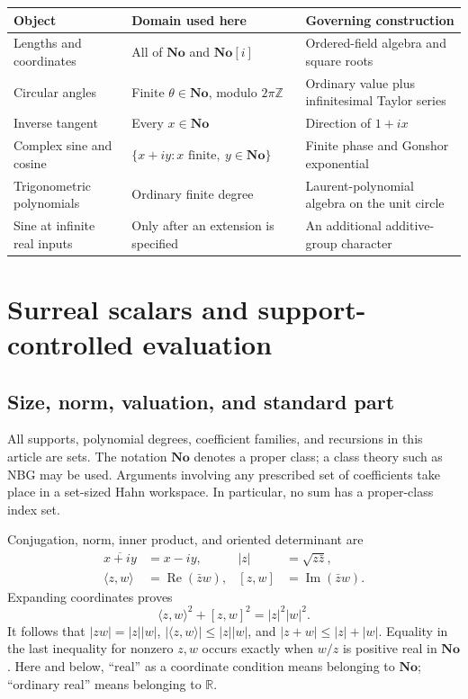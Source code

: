 \documentclass[11pt]{article}
\numberwithin{equation}{section}
\theoremstyle{definition}
\newcommand{\No}{\mathbf{No}}
\newcommand{\SC}{\mathbf{No}[i]}
\newcommand{\R}{\mathbb R}
\newcommand{\Z}{\mathbb Z}
\newcommand{\re}{\operatorname{Re}}
\newcommand{\im}{\operatorname{Im}}
\begin{document}
\begin{center}
\small
\begin{tabular}{L{0.23\textwidth}L{0.32\textwidth}L{0.35\textwidth}}
\toprule
Object & Domain used here & Governing construction\\
\midrule
Lengths and coordinates & All of $\No$ and $\SC$ & Ordered-field algebra and square roots\\
Circular angles & Finite $\theta\in\No$, modulo $2\pi\Z$ & Ordinary value plus infinitesimal Taylor series\\
Inverse tangent & Every $x\in\No$ & Direction of $1+ix$\\
Complex sine and cosine & $\{x+iy:x\text{ finite},\ y\in\No\}$ & Finite phase and Gonshor exponential\\
Trigonometric polynomials & Ordinary finite degree & Laurent-polynomial algebra on the unit circle\\
Sine at infinite real inputs & Only after an extension is specified & An additional additive-group character\\
\bottomrule
\end{tabular}
\end{center}

\section{Surreal scalars and support-controlled evaluation}\label{sec:foundations}
\subsection{Size, norm, valuation, and standard part}
All supports, polynomial degrees, coefficient families, and recursions in this article are sets. The notation $\No$ denotes a proper class; a class theory such as NBG may be used. Arguments involving any prescribed set of coefficients take place in a set-sized Hahn workspace. In particular, no sum has a proper-class index set.

Conjugation, norm, inner product, and oriented determinant are
\begin{align}
 \overline{x+iy}&=x-iy,& |z|&=\sqrt{z\bar z},\\
 \langle z,w\rangle&=\re(\bar zw),&[z,w]&=\im(\bar zw).
 \label{eq:dotcross}
\end{align}
Expanding coordinates proves
\begin{equation}\label{eq:gram}
 \langle z,w\rangle^2+[z,w]^2=|z|^2|w|^2.
\end{equation}
It follows that $|zw|=|z||w|$, $|\langle z,w\rangle|\le|z||w|$, and $|z+w|\le|z|+|w|$. Equality in the last inequality for nonzero $z,w$ occurs exactly when $w/z$ is positive real in $\No$. Here and below, ``real'' as a coordinate condition means belonging to $\No$; ``ordinary real'' means belonging to $\R$.
\end{document}
